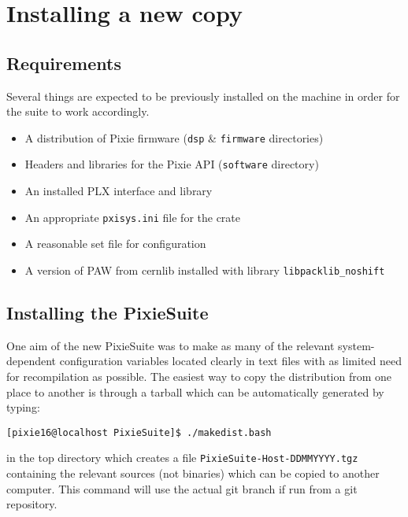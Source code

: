 \documentclass[10pt]{article}
\begin{document}
\section{\label{sec:install}Installing a new copy}
\subsection{Requirements}
Several things are expected to be previously installed on the machine in order 
for the suite to work accordingly.
\begin{itemize}
\item A distribution of Pixie firmware (\texttt{dsp} \& \texttt{firmware} 
directories)
\item Headers and libraries for the Pixie API (\texttt{software} directory)
\item An installed PLX interface and library
\item An appropriate \texttt{pxisys.ini} file for the crate
\item A reasonable set file for configuration
\item A version of PAW from cernlib installed with library 
\texttt{libpacklib\_noshift}
\end{itemize}
\subsection{Installing the PixieSuite}
One aim of the new PixieSuite was to make as many of the relevant 
system-dependent configuration variables located clearly in text files with as 
limited need for recompilation as possible. The easiest way to copy the 
distribution from one place to another is through a tarball which can be 
automatically generated by typing:
\begin{verbatim}
[pixie16@localhost PixieSuite]$ ./makedist.bash
\end{verbatim}
in the top directory which creates a file
\texttt{PixieSuite-Host-DDMMYYYY.tgz} containing the relevant sources (not
binaries) which can be copied to another computer. This command will use the
actual git branch if run from a git repository.
\end{document}
